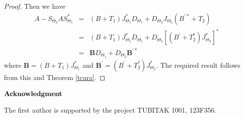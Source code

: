 \documentclass[11pt]{amsart}
\numberwithin{equation}{section}
\newcommand{\B}{{\mathbf{B}}}
\theoremstyle{definition}
\numberwithin{equation}{section}
\begin{document}
\begin{proof}
  Then we have
\begin{eqnarray*}
  A-S_{\Theta_2}AS_{\Theta_1}^*
  & =&(B+T_{1})J_{\Theta_{1}}^{*}D_{\Theta_{1}}+D_{\Theta_{2}}J_{\Theta_{2}}(B^{\prime *}+T_{2})\\
   & =&(B+T_{1})J_{\Theta_{1}}^{*}D_{\Theta_{1}}+D_{\Theta_{2}}[(B^{\prime}+T_{2}^{*})J_{\Theta_{2}}^{*}]^{*}\\
   &=& \B D_{\Theta_{1}}+D_{\Theta_{2}}\B^{\prime *}
 \end{eqnarray*}
 where $\B = (B+T_{1})J_{\Theta_{1}}^{*}$ and $\B^{\prime} = (B^{\prime}+T_{2}^{*})J_{\Theta_{2}}^{*}$.  The required result follows from this and Theorem \ref{tcara}.
\end{proof}


\medskip

\noindent$\bf{Acknowledgment}$

\noindent The first author is supported by the project TUBITAK 1001, 123F356.
\end{document}
